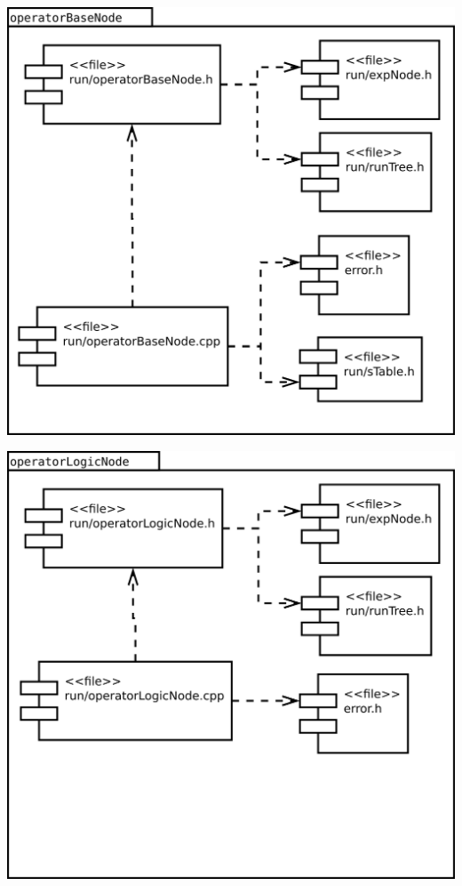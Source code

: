 \begin{multicols}{2}
\begin{center}
\includegraphics[scale=0.3]{files_arquitecture/operatorBaseNode.png} \\
\end{center}
\begin{center}
\includegraphics[scale=0.3]{files_arquitecture/operatorLogicNode.png} \\
\end{center}
\end{multicols}

